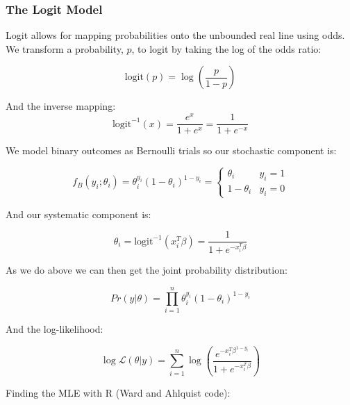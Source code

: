 \documentclass[
]{article}
\begin{document}
\hypertarget{the-logit-model}{%
\subsubsection{The Logit Model}\label{the-logit-model}}

Logit allows for mapping probabilities onto the unbounded real line
using odds. We transform a probability, \(p\), to logit by taking the
log of the odds ratio:

\[\mathrm{logit}(p)=\log(\frac{p}{1-p})\]

And the inverse mapping:\\

\[
\mathrm{logit}^{-1}(x)=\frac{e^x}{1+e^x}=\frac{1}{1+e^{-x}}
\]

We model binary outcomes as Bernoulli trials so our stochastic component
is:

\[
f_B(y_i;\theta_i)=\theta_i^{y_i}(1-\theta_i)^{1-y_i}= 
   \left\{
\begin{array}{ll}
      \theta_i & y_i=1 \\
      1-\theta_i & y_i=0
\end{array} 
\right. 
\]

And our systematic component is:

\[
\theta_i=\mathrm{logit}^{-1}(x_i^T\beta)=\frac{1}{1+e^{-x_i^T\beta}}
\]

As we do above we can then get the joint probability distribution:

\[
Pr(y|\theta)=\prod_{i=1}^n \theta_i^{y_i}(1-\theta_i)^{1-y_i}
\]

And the log-likelihood:

\[
\log\mathcal{L}(\theta|y)=\sum_{i=1}^n\log(\frac{e^{-x_i^T\beta^{1-y_i}}}{1+e^{-x_i^T\beta}})
\]

Finding the MLE with R (Ward and Ahlquist code):
\end{document}
